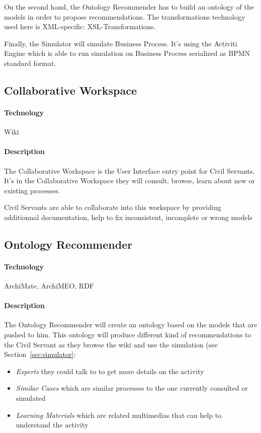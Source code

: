 \documentclass{learnpad}
\begin{document}
On the second hand, the Ontology Recommender has to build an ontology of the
models in order to propose recommendations.  The transformations technology used
here is XML-specific: XSL-Transformations.

Finally, the Simulator will simulate Business Process.  It's using the Activiti
Engine which is able to run simulation on Business Process serialized as BPMN
standard format.

\subsection{Collaborative Workspace}
\label{sec:collaborative-workspace}

\paragraph{Technology}
Wiki

\paragraph{Description}
The Collaborative Workspace is the User Interface entry point for Civil
Servants.  It's in the Collaborative Workspace they will consult, browse, learn
about new or existing processes.

Civil Servants are able to collaborate into this workspace by providing
additionnal documentation, help to fix inconsistent, incomplete or wrong models

\subsection{Ontology Recommender}
\label{sec:ontology-recommender}

\paragraph{Technology}
ArchiMate, ArchiMEO, RDF

\paragraph{Description}
The Ontology Recommender will create an ontology based on the models that are
pushed to him.  This ontology will produce different kind of recommendations to
the Civil Servant as they browse the wiki and use the simulation (see
Section~\ref{sec:simulator}:
\begin{itemize}
	\item \emph{Experts} they could talk to to get more details on the activity
	\item \emph{Similar Cases} which are similar processes to the one currently
		consulted or simulated
	\item \emph{Learning Materials} which are related
		multimedias that can help to understand the activity
\end{itemize}
\end{document}
